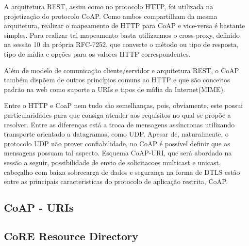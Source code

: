 A arquitetura REST, assim como no protocolo HTTP\cite{rfc2616}, foi utilizada na projetização do protocolo CoAP.
Como ambos compartilham da mesma arquitetura, realizar o mapeamento de HTTP para CoAP e vice-versa é bastante simples.
Para realizar tal mapeamento basta utilizarmos o cross-proxy, definido na sessão 10 da própria RFC-7252\cite{rfc7252},
que converte o método ou tipo de resposta, tipo de mídia e opções para os valores HTTP correspondentes.

Além de modelo de comunicação cliente/servidor e arquitetura REST, o CoAP também dispõem de outros princípios comuns ao HTTP e que são conceitos padrão na web
como suporte a URIs\cite{rfc3986} e tipos de mídia da Internet(MIME)\cite{rfc2046}.

Entre o HTTP e CoaP nem tudo são semelhanças, pois, obviamente, este possui particularidades para que consiga atender aos requisitos no qual se propõe a resolver.
Entre as diferenças está a troca de mensagens assíncronas utilizando transporte orientado a datagramas, como UDP.
Apesar de, naturalmente, o protocolo UDP não prover confiabilidade, no CoAP é possível definir que as mensagens possuam tal aspecto.
Esquema CoAP-URI, que será abordado na sessão a seguir, possibilidade de envio de solicitacoes multicast e unicast, cabeçalho com baixa sobrecarga de dados e segurança na forma de DTLS\cite{rfc6347}
estão entre as principais caracteristicas do protocolo de aplicação restrita, CoAP.

\subsection{CoAP - URIs }






\subsection{CoRE Resource Directory}





